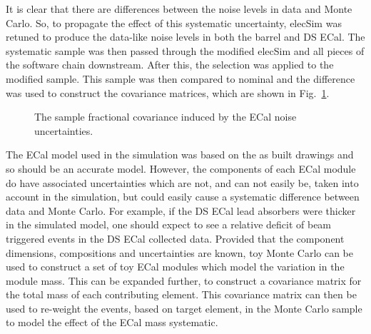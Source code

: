It is clear that there are differences between the noise levels in data and Monte Carlo.  So, to propagate the effect of this systematic uncertainty, elecSim was retuned to produce the data-like noise levels in both the barrel and DS ECal.  The systematic sample was then passed through the modified elecSim and all pieces of the software chain downstream.  After this, the selection was applied to the modified sample.  This sample was then compared to nominal and the difference was used to construct the covariance matrices, which are shown in Fig.~\ref{fig:ECalNoiseCovarianceMatrices}.
\begin{figure}%
  \centering
  \caption{The sample fractional covariance induced by the ECal noise uncertainties.}
  \label{fig:ECalNoiseCovarianceMatrices}
\end{figure}
\newline
\newline
The ECal model used in the simulation was based on the as built drawings and so should be an accurate model.  However, the components of each ECal module do have associated uncertainties which are not, and can not easily be, taken into account in the simulation, but could easily cause a systematic difference between data and Monte Carlo.  For example, if the DS ECal lead absorbers were thicker in the simulated model, one should expect to see a relative deficit of beam triggered events in the DS ECal collected data.  Provided that the component dimensions, compositions and uncertainties are known, toy Monte Carlo can be used to construct a set of toy ECal modules which model the variation in the module mass.  This can be expanded further, to construct a covariance matrix for the total mass of each contributing element.  This covariance matrix can then be used to re-weight the events, based on target element, in the Monte Carlo sample to model the effect of the ECal mass systematic.  
